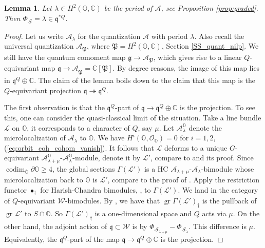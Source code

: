 \documentclass[12pt]{amsart}
\newcommand{\C}{\mathbb{C}}
\newcommand{\A}{\mathcal{A}}
\newcommand{\g}{\mathfrak{g}}
\newcommand{\Orb}{\mathbb{O}}
\newcommand{\Walg}{\mathcal{W}}
\newcommand{\gr}{\operatorname{gr}}
\newcommand{\q}{\mathfrak{q}}
\newcommand{\param}{\mathfrak{P}}
\newtheorem{Lem}[Thm]{Lemma}
\theoremstyle{definition}
\numberwithin{equation}{section}
\begin{document}
\begin{Lem}\label{Lem:quantum_comom_period}
Let $\lambda \in H^2(\Orb, \C)$ be the period of $\A$, see
Proposition \ref{prop:graded}. Then $\Phi_{\underline{\A}}=\lambda \in  \q^{*Q}$.
\end{Lem}
\begin{proof}
Let us write $\A_\lambda$ for the quantization $\A$ with period $\lambda$. Also recall the universal
quantization $\A_{\param}$, where $\param=H^2(\Orb,\C)$, Section \ref{SS_quant_nilp}.  We still have the quantum comoment map $\g\rightarrow \A_{\param}$,
which gives rise to a linear $Q$-equivariant map $\q\rightarrow \underline{\A}_{\param}=\C[\param]$. By degree reasons, the image of this map lies in $\q^{Q}\oplus \C$. The claim of the lemma
boils down to the claim that this map is the $Q$-equivariant  projection
$\q\twoheadrightarrow \q^{Q}$.

The first observation is that the $\q^Q$-part of $\q\rightarrow \q^Q\oplus \C$ is the projection.
To see this, one can consider the quasi-classical limit of the situation. Take a line
bundle $\mathcal{L}$ on $\Orb$, it corresponds to a character of $Q$, say $\mu$. Let $\A^\Orb_\lambda$ denote
the microlocalization of $\A_\lambda$ to $\Orb$.
We have $H^i(\Orb,\mathcal{O}_{\Orb})=0$ for $i=1,2$, (\ref{eq:orbit_coh_cohom_vanish}).
It follows that $\mathcal{L}$ deforms to a unique $G$-equivariant $\A^\Orb_{\lambda+\mu}$-$\A^\Orb_{\lambda}$-module, denote it by $\mathcal{L}'$, compare to
\cite[Proposition 5.2]{BPW} and its proof. Since $\operatorname{codim}_{\overline{\Orb}}\partial\Orb\geqslant 4$,  the global sections
$\Gamma(\mathcal{L}')$ is a HC $\A_{\lambda+\mu}$-$\A_\lambda$-bimodule whose microlocalization
back to $\Orb$ is $\mathcal{L}'$, compare to the proof of \cite[Theorem 4.4]{reg}.
Apply the restriction functor $\bullet_\dagger$ for Harish-Chandra bimodules, \cite[Section 3.4]{HC},
to $\Gamma(\mathcal{L}')$. We land in the category of $Q$-equivariant $\Walg$-bimodules. By \cite[Lemma 3.3.2]{HC}, we have that $\gr \Gamma(\mathcal{L}')_\dagger$
is the pullback of $\gr\mathcal{L}'$ to $S\cap \Orb$. So $\Gamma(\mathcal{L}')_\dagger$ is a one-dimensional
space and $Q$ acts via $\mu$. On the other hand, the adjoint action of $\mathfrak{q}\subset \Walg$
is by $\Phi_{\underline{\A}_{\lambda+\mu}}-\Phi_{\underline{\A}_\lambda}$. This difference is $\mu$. 
Equivalently, the $\q^Q$-part of the map $\q\rightarrow \q^Q\oplus \C$ is the projection.
%


\end{proof}
\end{document}
